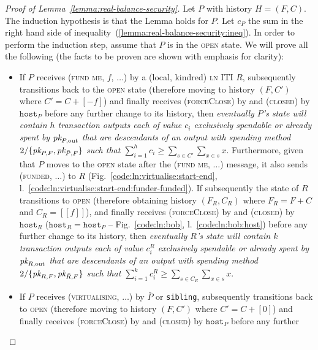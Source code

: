 \begin{proof}[Proof of Lemma~\ref{lemma:real-balance-security}]
  Let $P$ with history $H = (F, C)$. The induction hypothesis is that the Lemma
  holds for $P$. Let $c_P$ the sum in the right hand side of
  inequality~(\ref{lemma:real-balance-security:ineq}). In order to perform the
  induction step, assume that $P$ is in the \textsc{open} state. We will prove
  all the following (the facts to be proven are shown with emphasis for
  clarity):
  \begin{itemize}
    \item If $P$ receives (\textsc{fund me}, $f$, $\dots$) by a (local, kindred)
    \textsc{ln} ITI $R$, subsequently transitions back to the \textsc{open}
    state (therefore moving to history $(F, C')$ where $C' = C + [-f]$) and
    finally receives (\textsc{forceClose}) by \environment and (\textsc{closed}) by
    $\texttt{host}_P$ before any further change to its history, then
    \emph{eventually $P$'s \ledger state will contain $h$ transaction outputs
    each of value $c_i$ exclusively spendable or already spent by $\textit{pk}_{P,
    \mathrm{out}}$ that are descendants of an output with spending method
    $2/\{\textit{pk}_{P, F}, \textit{pk}_{\bar{P}, F}\}$ such that $\sum\limits_{i=1}^h c_i \geq
    \sum\limits_{s \in C'} \sum\limits_{x \in s} x$}. Furthermore, given that
    $P$ moves to the \textsc{open} state after the (\textsc{fund me}, $\dots$)
    message, it also sends (\textsc{funded}, $\dots$) to $R$
    (Fig.~\ref{code:ln:virtualise:start-end},
    l.~\ref{code:ln:virtualise:start-end:funder-funded}). If subsequently the
    state of $R$ transitions to \textsc{open} (therefore obtaining history
    $(F_R, C_R)$ where $F_R = F + C$ and $C_R = [[f]]$), and finally receives
    (\textsc{forceClose}) by \environment and (\textsc{closed}) by $\texttt{host}_R$
    ($\texttt{host}_R = \texttt{host}_P$ -- Fig.~\ref{code:ln:bob},
    l.~\ref{code:ln:bob:host}) before any further change to its history, then
    \emph{eventually $R$'s \ledger state will contain $k$ transaction outputs
    each of value $c^R_i$ exclusively spendable or already spent by $\textit{pk}_{R,
    \mathrm{out}}$ that are descendants of an output with spending method
    $2/\{\textit{pk}_{R, F}, \textit{pk}_{\bar{R}, F}\}$ such that $\sum\limits_{i=1}^k c^R_i \geq
    \sum\limits_{s \in C_R} \sum\limits_{x \in s} x$}.
    \item If $P$ receives (\textsc{virtualising}, $\dots$) by $\bar{P}$ or
    \texttt{sibling},
    subsequently transitions back to \textsc{open} (therefore moving to history
    $(F, C')$ where $C' = C + [0]$) and finally receives (\textsc{forceClose}) by
    \environment and (\textsc{closed}) by $\texttt{host}_P$ before any further

\end{itemize}
\end{proof}
